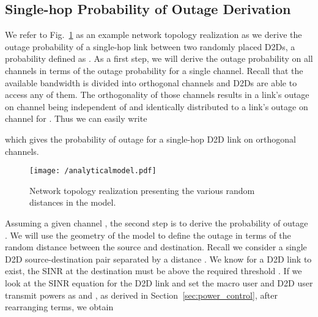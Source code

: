 \documentclass[10pt, final, journal, letterpaper,oneside, twocolumn]{IEEEtran}
\newcounter{EquationCounter}
\begin{document}
\subsection{Single-hop Probability of Outage Derivation}
\label{sec:single_hop_outage}
\begin{figure*}[!t]
\normalsize
\setcounter{EquationCounter}{\value{equation}}
\setcounter{equation}{11}

\setcounter{equation}{\value{EquationCounter}}
\hrulefill
\vspace*{-20pt} 
\end{figure*}
We refer to Fig.~\ref{fig:analyticalmodel} as an example network topology realization as we derive the outage probability of a single-hop link between two randomly placed D2Ds, a probability defined as .  As a first step, we will derive the outage probability on all channels in terms of the outage probability for a single channel.  Recall that the available bandwidth is divided into  orthogonal channels and D2Ds are able to access any of them.  The orthogonality of those channels results in a link's outage on channel  being independent of and identically distributed to a link's outage on channel  for .  Thus we can easily write 

which gives the probability of outage for a single-hop D2D link on  orthogonal channels.  
\begin{figure}[htp]
\center
 \texttt{[image: /analyticalmodel.pdf]}
  \caption[]{Network topology realization presenting the various random distances in the model.} 
  \label{fig:analyticalmodel}
\end{figure}

Assuming a given channel , the second step is to derive the probability of outage .  We will use the geometry of the model to define the outage in terms of the random distance between the source and destination.  Recall we consider a single D2D source-destination pair separated by a distance .  We know for a D2D link to exist, the SINR at the destination must be above the required threshold .  If we look at the SINR equation for the D2D link and set the macro user and D2D user transmit powers as  and , as derived in Section~\ref{sec:power_control}, after rearranging terms, we obtain 
\end{document}

